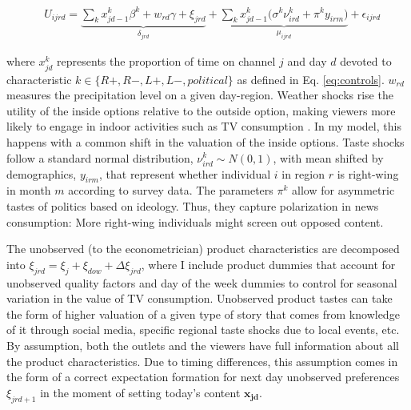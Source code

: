\documentclass[12pt]{article}
\begin{document}
	
	\begin{equation}\label{eq:utility}
		\begin{aligned}
			& U_{ijrd}= \underbrace{\sum_k x_{jd-1}^k\beta^k+w_{rd}   \gamma  +  \xi_{jrd}}_{\delta_{jrd}}  + \underbrace{  \sum_k x_{jd-1}^k \Big( \sigma^k \nu_{ird}^k  + \pi^ky_{irm} \Big)}_{\mu_{ijrd}}+\epsilon_{ijrd} 
		\end{aligned}
	\end{equation} 
	
	where $ x_{jd}^k $ represents the  proportion of time on channel $ j $ and day $ d$ devoted to characteristic $ k \in \{R+,R-,L+,L-,political\}$ as defined in Eq. \ref{eq:controls}. $w_{rd}$ measures the precipitation level on a given day-region. Weather shocks rise the utility of the inside options  relative to the outside option, making viewers more likely to engage in indoor activities such as TV consumption \citep{wilbur}. In my model, this happens with a common shift in the valuation of the inside options. Taste shocks follow a standard normal distribution, $ \nu_{ird}^k \sim N(0,1)$, with mean shifted by  demographics, $ y_{irm} $, that represent whether individual $i$ in region $r$ is right-wing in month $m$ according to survey data.	The parameters $\pi^k$ allow for asymmetric tastes of politics based on ideology. Thus, they capture polarization in news consumption: More right-wing individuals might screen out opposed content. 

The unobserved (to the econometrician) product characteristics are decomposed into $\xi_{jrd}= \xi_j + \xi_{dow} + \Delta \xi_{jrd}$, where I include product dummies that account for unobserved quality factors and day of the week dummies to control for  seasonal variation in the value of TV consumption. Unobserved product tastes can take the form of higher valuation of a given type of story that comes from knowledge of it through social media, specific regional taste shocks due to local events,  etc. By assumption, both the outlets and the viewers have full information about all the product characteristics. Due to timing differences, this assumption comes in the form of a correct expectation formation for next day unobserved preferences $ \xi_{jrd+1}$ in the moment of setting today's content $\bm{x_{jd}}$. 




	
\end{document}
